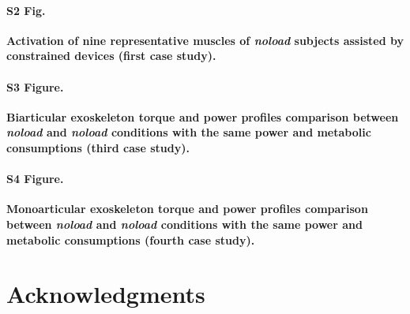 \documentclass[10pt,letterpaper]{article}
\begin{document}
\paragraph*{S2 Fig.}
\label{S2_Fig}
{\bf Activation of nine representative muscles of \textit{noload} subjects assisted by constrained devices (first case study).}

\paragraph*{S3 Figure.}
\label{S3_Figure}
{\bf Biarticular exoskeleton torque and power profiles comparison between  \textit{noload} and \textit{noload} conditions with the same power and metabolic consumptions (third case study).}

\paragraph*{S4 Figure.}
\label{S4_Figure}
{\bf Monoarticular exoskeleton torque and power profiles comparison between \textit{noload} and \textit{noload} conditions with the same power and metabolic consumptions (fourth case study).}


\section*{Acknowledgments}

\nolinenumbers

%
%
% 


\end{document}
